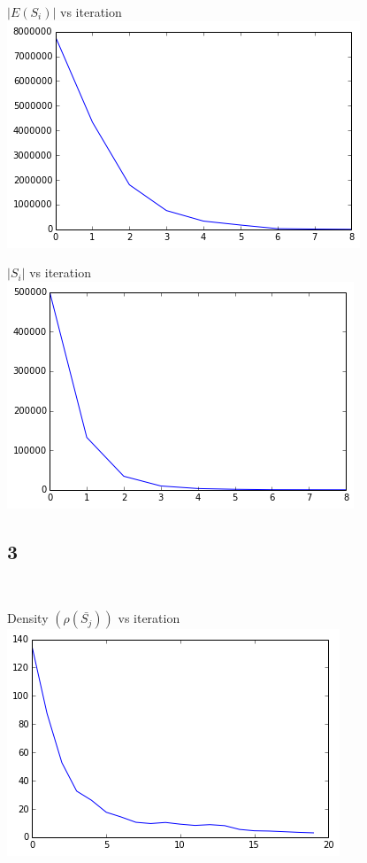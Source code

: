 \documentclass[11pt]{article}
\begin{document}
{$|E(S_i)|$ vs iteration\\
\includegraphics[scale=0.8]{q4c2indsetcnt}\\
\vspace{3cm}

$|S_i|$ vs iteration\\
\includegraphics[scale=0.8]{q4c2scnt}\


\pagebreak[4]
\subsection*{3}
\

Density $(\rho(\bar{S_j}))$ vs iteration\\
\includegraphics[scale=0.8]{q4c3densitycnt}\
\vspace{3cm}

}
\end{document}

